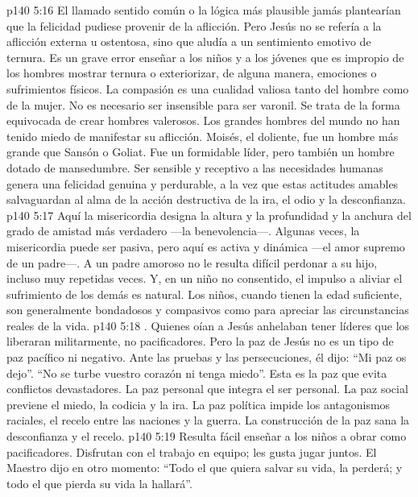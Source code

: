 \vs p140 5:16  El llamado sentido común o la lógica más plausible jamás plantearían que la felicidad pudiese provenir de la aflicción. Pero Jesús no se refería a la aflicción externa u ostentosa, sino que aludía a un sentimiento emotivo de ternura. Es un grave error enseñar a los niños y a los jóvenes que es impropio de los hombres mostrar ternura o exteriorizar, de alguna manera, emociones o sufrimientos físicos. La compasión es una cualidad valiosa tanto del hombre como de la mujer. No es necesario ser insensible para ser varonil. Se trata de la forma equivocada de crear hombres valerosos. Los grandes hombres del mundo no han tenido miedo de manifestar su aflicción. Moisés, el doliente, fue un hombre más grande que Sansón o Goliat. Fue un formidable líder, pero también un hombre dotado de mansedumbre. Ser sensible y receptivo a las necesidades humanas genera una felicidad genuina y perdurable, a la vez que estas actitudes amables salvaguardan al alma de la acción destructiva de la ira, el odio y la desconfianza.
\vs p140 5:17  Aquí la misericordia designa la altura y la profundidad y la anchura del grado de amistad más verdadero ---la benevolencia---. Algunas veces, la misericordia puede ser pasiva, pero aquí es activa y dinámica ---el amor supremo de un padre---. A un padre amoroso no le resulta difícil perdonar a su hijo, incluso muy repetidas veces. Y, en un niño no consentido, el impulso a aliviar el sufrimiento de los demás es natural. Los niños, cuando tienen la edad suficiente, son generalmente bondadosos y compasivos como para apreciar las circunstancias reales de la vida.
\vs p140 5:18 . Quienes oían a Jesús anhelaban tener líderes que los liberaran militarmente, no pacificadores. Pero la paz de Jesús no es un tipo de paz pacífico ni negativo. Ante las pruebas y las persecuciones, él dijo: “Mi paz os dejo”. “No se turbe vuestro corazón ni tenga miedo”. Esta es la paz que evita conflictos devastadores. La paz personal que integra el ser personal. La paz social previene el miedo, la codicia y la ira. La paz política impide los antagonismos raciales, el recelo entre las naciones y la guerra. La construcción de la paz sana la desconfianza y el recelo.
\vs p140 5:19 Resulta fácil enseñar a los niños a obrar como pacificadores. Disfrutan con el trabajo en equipo; les gusta jugar juntos. El Maestro dijo en otro momento: “Todo el que quiera salvar su vida, la perderá; y todo el que pierda su vida la hallará”.
